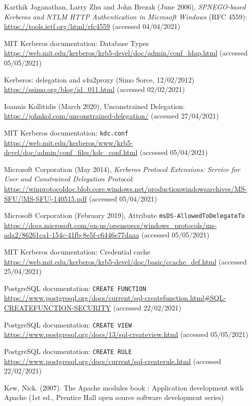 \documentclass[12pt]{report}
\begin{document}
\begin{thebibliography}{99}
 Karthik Jaganathan, Larry Zhu and John Brezak (June 2006), \textit{SPNEGO-based Kerberos and NTLM HTTP Authentication in Microsoft Windows} (RFC 4559): \url{https://tools.ietf.org/html/rfc4559} (accessed 04/04/2021)

 MIT Kerberos documentation: Database Types \url{https://web.mit.edu/kerberos/krb5-devel/doc/admin/conf_ldap.html} (accessed 05/05/2021)

 Kerberos: delegation and s4u2proxy (Simo Sorce, 12/02/2012) \url{https://ssimo.org/blog/id_011.html} (accessed 02/02/2021)

 Ioannis Kollitidis (March 2020), Unconstrained Delegation: \url{https://johnkol.com/unconstrained-delegation/} (accessed 27/04/2021)

 MIT Kerberos documentation: \texttt{kdc.conf} \url{https://web.mit.edu/kerberos/www/krb5-devel/doc/admin/conf_files/kdc_conf.html} (accessed 05/04/2021)

 Microsoft Corporation (May 2014), \textit{Kerberos Protocol Extensions: Service for User and Constrained Delegation Protocol}: \url{https://winprotocoldoc.blob.core.windows.net/productionwindowsarchives/MS-SFU/[MS-SFU]-140515.pdf} (accessed 05/04/2021)

 Microsoft Corporation (February 2019), Attribute \texttt{msDS-AllowedToDelegateTo} \url{https://docs.microsoft.com/en-us/openspecs/windows_protocols/ms-ada2/86261ca1-154c-41fb-8e5f-c6446e77daaa} (accessed 05/05/2021)

 MIT Kerberos documentation: Credential cache \url{https://web.mit.edu/kerberos/krb5-devel/doc/basic/ccache_def.html} (accessed 25/04/2021)

 PostgreSQL documentation: \texttt{CREATE FUNCTION} \url{https://www.postgresql.org/docs/current/sql-createfunction.html#SQL-CREATEFUNCTION-SECURITY} (accessed 22/02/2021)

 PostgreSQL documentation: \texttt{CREATE VIEW} \url{https://www.postgresql.org/docs/13/sql-createview.html} (accessed 05/05/2021)

 PostgreSQL documentation: \texttt{CREATE RULE} \url{https://www.postgresql.org/docs/current/sql-createrule.html} (accessed 22/02/2021)

 Kew, Nick. (2007). The Apache modules book : Application development with Apache (1st ed., Prentice Hall open source software development series)


\end{thebibliography}
\end{document}

